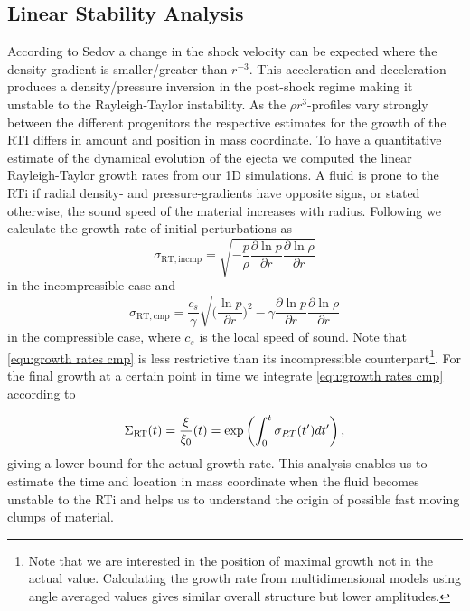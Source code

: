 \documentclass[fleqn,usenatbib]{mnras}
\begin{document}
\subsection{Linear Stability Analysis}
\label{sec:Linear Stability Analysis}
According to Sedov \cite{Sedov1961} a change in the shock velocity can be expected where the density gradient is smaller/greater than $r^{-3}$. This acceleration and deceleration produces a density/pressure inversion in the post-shock regime making it unstable to the Rayleigh-Taylor instability. As the $\rho r^3 $-profiles vary strongly between the different progenitors the respective estimates for the growth of the RTI differs in amount and position in mass coordinate.
To have a quantitative estimate of the dynamical evolution of the ejecta we computed the linear Rayleigh-Taylor growth rates from our 1D simulations. A fluid is prone to the RTi if radial density- and pressure-gradients have opposite signs, or stated otherwise, the sound speed of the material increases with radius. Following \cite{Mueller1991} we calculate the growth rate of initial perturbations as
\begin{equation}
  \label{equ:growth rates incmp}
  \sigma_{\mathrm{RT,incmp}} = \sqrt{- \frac{p}{\rho}\frac{\partial \ln p}{\partial r}\frac{\partial \ln \rho}{\partial r}}
\end{equation}
in the incompressible case and
\begin{equation}
  \sigma_{\mathrm{RT, cmp}} = \frac{c_{s}}{\gamma}\sqrt{\Big(\frac{\ln p}{\partial r}\Big)^ 2 - \gamma \frac{\partial \ln p}{\partial r}\frac{\partial \ln \rho}{\partial r}}\label{equ:growth rates cmp}
\end{equation}
in the compressible case, where $c_s$ is the local speed of sound. Note that \autoref{equ:growth rates cmp} is less restrictive than its incompressible counterpart\footnote{Note that we are interested in the position of maximal growth not in the actual value. Calculating the growth rate from multidimensional models using angle averaged values gives similar overall structure but lower amplitudes.}. 
For the final growth at a certain point in time we integrate \autoref{equ:growth rates cmp} according to

\begin{equation}
  \Sigma_{\rm RT}(t) = \frac{\xi}{\xi_0}(t) = \exp \left(\int_0^t \sigma_{RT} (t') dt' \right),\label{equ:growth rates int}
\end{equation}
giving a lower bound for the actual growth rate. This analysis enables us to estimate the time and location in mass coordinate when the fluid becomes unstable to the RTi and helps us to understand the origin of possible fast moving clumps of material.
\end{document}
